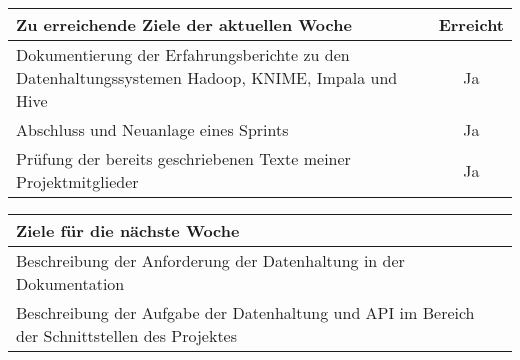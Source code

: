 \begin{tabularx}{\textwidth}{Xc}
    \arrayrulecolor{OliveGreen}
    \toprule
    {\bfseries Zu erreichende Ziele der aktuellen Woche} & {\bfseries Erreicht} \\
    \midrule[2pt]
    Dokumentierung der Erfahrungsberichte zu den Datenhaltungssystemen Hadoop,
    KNIME, Impala und Hive  &  Ja  \\
    \rowcolor{OliveGreen!15}
    Abschluss und Neuanlage eines Sprints  &  Ja  \\
    \rowcolor{White}
    Prüfung der bereits geschriebenen Texte meiner Projektmitglieder  &  Ja  \\
    \bottomrule[2pt]
\end{tabularx}
%
\vspace{1cm}
%
\begin{tabularx}{\textwidth}{Xc}
    \arrayrulecolor{OliveGreen}
    \toprule
    {\bfseries Ziele für die nächste Woche}              &                    \\
    \midrule[2pt]
    Beschreibung der Anforderung der Datenhaltung in der Dokumentation & \\
    \rowcolor{OliveGreen!15}
    Beschreibung der Aufgabe der Datenhaltung und API im Bereich der 
    Schnittstellen des Projektes & \\
\end{tabularx}
